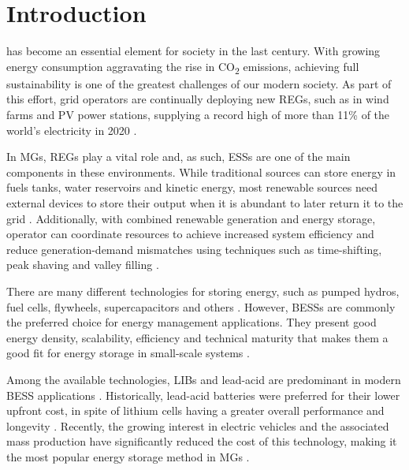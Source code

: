 \documentclass{ieeeaccess}
\begin{document}
    \titlepgskip=-15pt

    \maketitle

    \section{Introduction}
    \label{sec:introduction}
     has become an essential element for society in the last century. With growing energy consumption aggravating the rise in CO\textsubscript{2} emissions, achieving full sustainability is one of the greatest challenges of our modern society. As part of this effort, grid operators are continually deploying new \acp{REG}, such as in wind farms and \ac{PV} power stations, supplying a record high of more than 11\% of the world's electricity in 2020 \cite{EMBER2021}.

    In \acp{MG}, \acp{REG} play a vital role and, as such, \acp{ESS} are one of the main components in these environments. While traditional sources can store energy in fuels tanks, water reservoirs and kinetic energy, most renewable sources need external devices to store their output when it is abundant to later return it to the grid \cite{STECCA2020}. Additionally, with combined renewable generation and energy storage,  operator can coordinate resources to achieve increased system efficiency and reduce generation-demand mismatches using techniques such as time-shifting, peak shaving and valley filling \cite{WANG20196201, LI2020106058, PARRA2015576, ZHANG2019772}.

    There are many different technologies for storing energy, such as pumped hydros, fuel cells, flywheels, supercapacitors and others \cite{IBRAHIM2008}. However, \acp{BESS} are commonly the preferred choice for energy management applications. They present good energy density, scalability, efficiency and technical maturity that makes them a good fit for energy storage in small-scale systems \cite{KOCER2019, martins2018optimal, FU20136749070}.

    Among the available technologies, \acp{LIB} and lead-acid are predominant in modern \ac{BESS} applications \cite{FU20136749070, ALSAIDAN8094981}. Historically, lead-acid batteries were preferred for their lower upfront cost, in spite of lithium cells having a greater overall performance and longevity \cite{wang2013li, xu2010lithium}. Recently, the growing interest in electric vehicles and the associated mass production have significantly reduced the cost of this technology, making it the most popular energy storage method in \acp{MG} \cite{mongird20202020, BBERG2020, zhang2018energy}.
\end{document}
